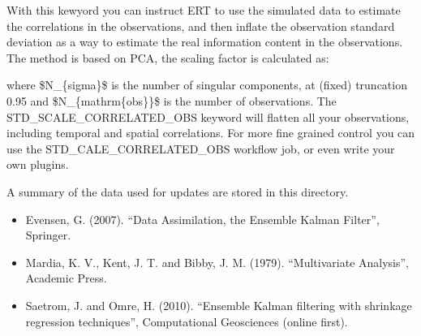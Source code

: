 \documentclass[a4paper,10pt,english]{sphinxmanual}
\begin{document}
\begin{sphinxShadowBox}

With this kewyord you can instruct ERT to use the simulated data to
estimate the correlations in the observations, and then inflate the
observation standard deviation as a way to estimate the real information
content in the observations. The method is based on PCA, the scaling
factor is calculated as:

%
\begin{sphinxVerbatim}[commandchars=\\\{\}]
\PYGZbs{}\PYGZbs{}\PYGZbs{}\PYGZbs{}
\end{sphinxVerbatim}

where \$N\_\{sigma\}\$ is the number of singular components, at (fixed)
truncation 0.95 and \$N\_\{mathrm\{obs\}\}\$ is the number of observations.
The STD\_SCALE\_CORRELATED\_OBS keyword will flatten all your observations,
including temporal and spatial correlations. For more fine grained
control you can use the STD\_CALE\_CORRELATED\_OBS workflow job, or even
write your own plugins.
\end{sphinxShadowBox}
\label{\detokenize{keywords/index:update-log-path}}
\begin{sphinxShadowBox}

A summary of the data used for updates are stored in this directory.
\end{sphinxShadowBox}

\begin{itemize}
\item {} 
Evensen, G. (2007). “Data Assimilation, the Ensemble Kalman Filter”, Springer.

\item {} 
Mardia, K. V., Kent, J. T. and Bibby, J. M. (1979). “Multivariate Analysis”, Academic Press.

\item {} 
Saetrom, J. and Omre, H. (2010). “Ensemble Kalman filtering with shrinkage regression techniques”, Computational Geosciences (online first).

\end{itemize}
\end{document}
